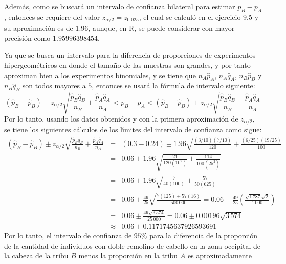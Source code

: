 \begin{solucion}
\begin{itemize}
 \end{itemize}
 Adem\'as, como se buscar\'a un intervalo de confianza bilateral para estimar $p_B - p_A$, entonces se requiere del valor $z_{\alpha/2} = z_{0.025}$, el cual se calcul\'o en el ejercicio 9.5 y su aproximaci\'on es de $1.96$, aunque, en R, se puede considerar con mayor precisi\'on como $1.95996398454$.
 \par 
 Ya que se busca un intervalo para la diferencia de proporciones de experimentos hipergeom\'etricos en donde el tama\~no de las muestras son grandes, y por tanto aproximan bien a los experimentos binomiales, y se tiene que $n_A\hat{p}_A$, $n_A\hat{q}_A$, $n_B\hat{p}_B$ y $n_B\hat{q}_B$ son todos mayores a $5$, entonces se usar\'a la f\'ormula de intervalo siguiente:
 \begin{equation*}
  \left( \hat{p}_B - \hat{p}_B \right) - z_{\alpha/2} \sqrt{\frac{\hat{p}_B\hat{q}_B}{n_B} + \frac{\hat{p}_A\hat{q}_A}{n_A}} < p_B - p_A < \left( \hat{p}_B - \hat{p}_B \right) + z_{\alpha/2} \sqrt{\frac{\hat{p}_B\hat{q}_B}{n_B} + \frac{\hat{p}_A\hat{q}_A}{n_A}}
 \end{equation*}
 Por lo tanto, usando los datos obtenidos y con la primera aproximaci\'on de $z_{\alpha/2}$, se tiene los siguientes c\'alculos de los l\'{\i}mites del intervalo de confianza como sigue:
 \begin{eqnarray*}
  \left( \hat{p}_B - \hat{p}_B \right) \pm z_{\alpha/2} \sqrt{\frac{\hat{p}_B\hat{q}_B}{n_B} + \frac{\hat{p}_A\hat{q}_A}{n_A}} & = & (0.3 - 0.24) \pm 1.96 \sqrt{\frac{(3/10)(7/10)}{120} + \frac{(6/25)(19/25)}{100}} \\
  & = & 0.06 \pm 1.96\sqrt{\frac{21}{120\left(10^2\right)} + \frac{114}{100\left( 25^2 \right)}} \\
  & = & 0.06 \pm 1.96 \sqrt{\frac{7}{40(100)} + \frac{57}{50(625)}} \\
  & = & 0.06 \pm \frac{49}{25} \sqrt{\frac{7(125) + 57(16)}{500\,000}} = 0.06 \pm \frac{49}{25} \left( \frac{\sqrt{1\,787}\sqrt{2}}{1\,000} \right) \\
  & = & 0.06 \pm \frac{49\sqrt{3\,574}}{25\,000} = 0.06 \pm 0.00196\sqrt{3\,574} \\
  & \approx & 0.06 \pm 0.1171745637926593691
 \end{eqnarray*}
 Por lo tanto, el intervalo de confianza de $95\%$ para la diferencia de la proporci\'on de la cantidad de individuos con doble remolino de cabello en la zona occipital de la cabeza de la tribu $B$ menos la proporci\'on en la tribu $A$ es aproximadamente
 \begin{equation*}

\end{equation*}
\end{solucion}
